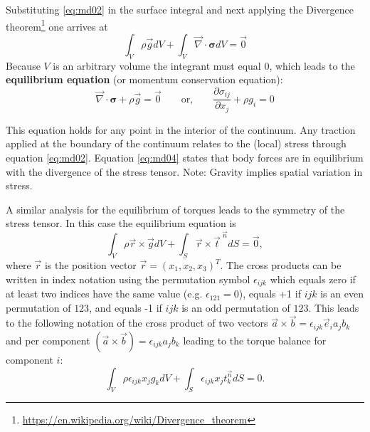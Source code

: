 Substituting \eqref{eq:md02} in the surface integral and next 
applying the Divergence 
theorem\footnote{\url{https://en.wikipedia.org/wiki/Divergence_theorem}}
one arrives at
\[
\int_V \rho \vec{g} dV + \int_V \vec\nabla \cdot {\bm\sigma} dV = \vec{0}
\]
Because $V$ is an
arbitrary volume the integrant must equal 0, which leads to the 
{\bf equilibrium equation} (or momentum conservation equation):
\begin{equation}
\vec\nabla \cdot {\bm\sigma} +  \rho \vec{g} = \vec{0} 
\qquad
\text{or,}
\qquad
\frac{\partial \sigma_{ij}}{\partial x_j} + \rho g_i = 0
\label{eq:md04}
\end{equation}

This equation holds for any point in the interior of the continuum. 
Any traction applied at the boundary of the continuum relates to 
the (local) stress through equation \eqref{eq:md02}. Equation
\eqref{eq:md04} states that body forces are in equilibrium 
with the divergence of the stress tensor.
Note: Gravity implies spatial variation in stress.

A similar analysis for the equilibrium of torques leads to the symmetry of the stress
tensor. In this case the equilibrium equation is
\[
\int_V \rho \vec{r} \times \vec{g}  dV 
+ 
\int_S \vec{r} \times \vec{t}^{\;\vec n} dS = \vec{0},
\]
where $\vec{r}$ is the position vector 
$\vec{r}=(x_1,x_2,x_3)^T$. The cross products can be written in
index notation using the permutation symbol $\epsilon_{ijk}$
which equals zero if at least two indices
have the same value (e.g. $\epsilon_{121}=0$), 
equals +1 if $ijk$ is an even permutation of $123$, 
and
equals -1 if $ijk$ is an odd permutation of $123$. 
This leads to the following notation of the
cross product of two vectors 
$\vec{a}\times \vec{b}= \epsilon_{ijk} \vec{e}_i a_j b_k$
and per component 
$(\vec{a}\times \vec{b})=\epsilon_{ijk} a_j b_k$
leading to the torque balance for component $i$:
\[
\int_V \rho \epsilon_{ijk} x_j g_k dV + \int_S \epsilon_{ijk} x_j t^{\vec{n}}_k dS=0.
\]


\vspace{0.5cm}
\vspace{0.5cm}

